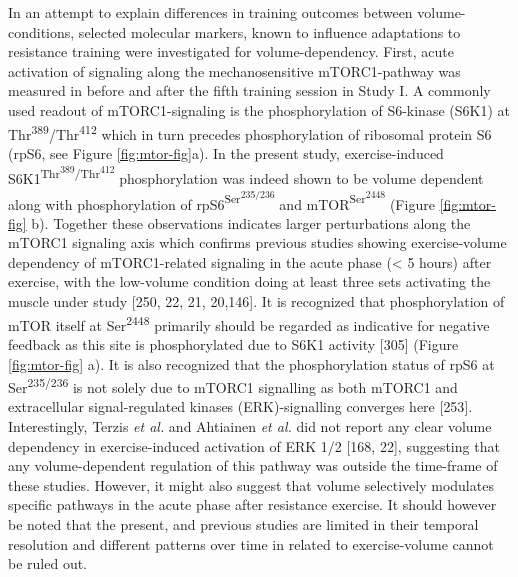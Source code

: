 \documentclass[twoside,10pt]{gihclass} %
\begin{document}
In an attempt to explain differences in training outcomes between volume-conditions, selected molecular markers, known to influence adaptations to resistance training were investigated for volume-dependency.
First, acute activation of signaling along the mechanosensitive mTORC1-pathway was measured in before and after the fifth training session in Study I.
A commonly used readout of mTORC1-signaling is the phosphorylation of S6-kinase (S6K1) at Thr\textsuperscript{389}/Thr\textsuperscript{412} which in turn precedes phosphorylation of ribosomal protein S6 (rpS6, see Figure \ref{fig:mtor-fig}a).
In the present study, exercise-induced S6K1\textsuperscript{Thr\textsuperscript{389}/Thr\textsuperscript{412}} phosphorylation was indeed shown to be volume dependent along with phosphorylation of rpS6\textsuperscript{Ser\textsuperscript{235/236}} and mTOR\textsuperscript{Ser\textsuperscript{2448}} (Figure \ref{fig:mtor-fig} b).
Together these observations indicates larger perturbations along the mTORC1 signaling axis which confirms previous studies showing exercise-volume dependency of mTORC1-related signaling in the acute phase (\textless{} 5 hours) after exercise, with the low-volume condition doing at least three sets activating the muscle under study
{[}250, 22, 21, 20,146{]}.
It is recognized that phosphorylation of mTOR itself at Ser\textsuperscript{2448} primarily should be regarded as indicative for negative feedback as this site is phosphorylated due to S6K1 activity
{[}305{]} (Figure \ref{fig:mtor-fig} a).
It is also recognized that the phosphorylation status of rpS6 at Ser\textsuperscript{235/236} is not solely due to mTORC1 signalling as both mTORC1 and extracellular signal-regulated kinases (ERK)-signalling converges here
{[}253{]}.
Interestingly, Terzis \emph{et al.} and Ahtiainen \emph{et al.} did not report any clear volume dependency in exercise-induced activation of ERK 1/2
{[}168, 22{]},
suggesting that any volume-dependent regulation of this pathway was outside the time-frame of these studies. However, it might also suggest that volume selectively modulates specific pathways in the acute phase after resistance exercise.
It should however be noted that the present, and previous studies are limited in their temporal resolution and different patterns over time in related to exercise-volume cannot be ruled out.
\end{document}
